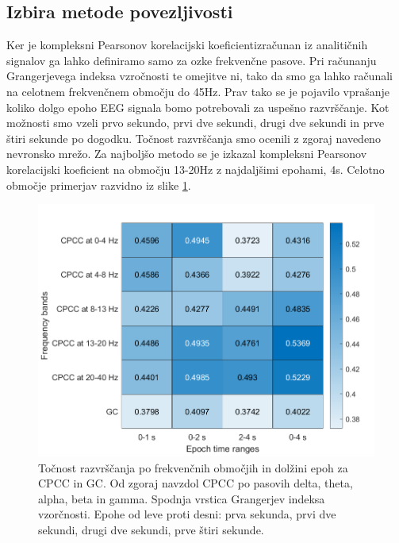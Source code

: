 \subsection{Izbira metode povezljivosti}
Ker je kompleksni Pearsonov korelacijski koeficientizračunan iz analitičnih signalov ga lahko definiramo samo za ozke frekvenčne pasove. Pri računanju Grangerjevega indeksa vzročnosti te omejitve ni, tako da smo ga lahko računali na celotnem frekvenčnem območju do 45Hz. Prav tako se je pojavilo vprašanje koliko dolgo epoho EEG signala bomo potrebovali za uspešno razvrščanje. Kot možnosti smo vzeli prvo sekundo, prvi dve sekundi, drugi dve sekundi in prve štiri sekunde po dogodku. Točnost razvrščanja smo ocenili z zgoraj navedeno nevronsko mrežo. Za najboljšo metodo se je izkazal kompleksni Pearsonov korelacijski koeficient na območju 13-20Hz z najdaljšimi epohami, 4s. Celotno območje primerjav razvidno iz slike \ref{slika:primerjava_obmocij}.
\begin{figure}
    \begin{center}
    \includegraphics[width=1\linewidth]{slike/Comparison.png}
    \end{center}
    \caption[Točnost razvrščanja po frekvenčnih območjih in dolžini epoh.]{Točnost razvrščanja po frekvenčnih območjih in dolžini epoh za CPCC in GC. Od zgoraj navzdol CPCC po pasovih delta, theta, alpha, beta in gamma. Spodnja vrstica Grangerjev indeksa vzorčnosti. Epohe od leve proti desni: prva sekunda, prvi dve sekundi, drugi dve sekundi, prve štiri sekunde.}
    \label{slika:primerjava_obmocij}
\end{figure}

